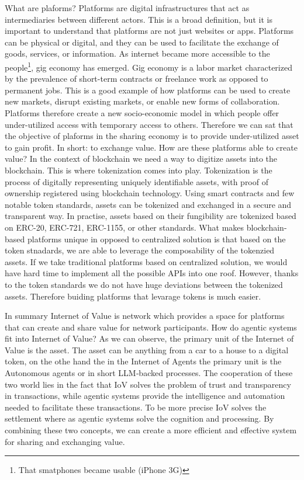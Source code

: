What are plaforms?  Platforms are digital infrastructures that act as intermediaries between different actors. This is a broad definition, but it is important to understand that platforms are not just websites or apps. Platforms can be physical or digital, and they can be used to facilitate the exchange of goods, services, or information. As internet became more accessible to the people\footnote{That smatphones became usable (iPhone 3G)}, gig economy has emerged. Gig economy is a labor market characterized by the prevalence of short-term contracts or freelance work as opposed to permanent jobs. This is a good example of how platforms can be used to create new markets, disrupt existing markets, or enable new forms of collaboration. Platforms therefore create a new socio-economic model in which people offer under-utilized access with temporary access to others. Therefore we can sat that the objective of plaforms in the sharing economy is to provide under-utilized asset to gain profit.
In short: to exchange value. How are these platforms able to create value? In the context of blockchain we need a way to digitize assets into the blockchain. This is where tokenization comes into play. Tokenization is the process of digitally representing uniquely identifiable assets, with proof of ownership registered using blockchain technology. Using smart contracts and few notable token standards, assets can be tokenized and exchanged in a secure and transparent way. In practise, assets based on their fungibility are tokenized based on ERC-20, ERC-721, ERC-1155, or other standards. What makes blockchain-based platforms unique in opposed to centralized solution is that based on the token stnadards, we are able to leverage the composability of the tokenzied assets. If we take traditional platforms based on centralized solution, we would have hard time to implement all the possible APIs into one roof. However, thanks to the token standards we do not have huge deviations between the tokenized assets. Therefore buiding platforms that levarage tokens is much easier.

In summary Internet of Value is network which provides a space for platforms that can create and share value for network participants.
How do agentic systems fit into Internet of Value? As we can observe, the primary unit of the Internet of Value is the asset.
The asset can be anything from a car to a house to a digital token, on the othe hand the in the Internet of Agents the primary unit is the Autonomous agents or in short LLM‑backed processes.
The cooperation of these two world lies in the fact that IoV solves the problem of trust and transparency in transactions, while agentic systems provide the intelligence and automation needed to facilitate these transactions.
To be more precise IoV solves the settlement where as agentic systems solve the cognition and processing.
By combining these two concepts, we can create a more efficient and effective system for sharing and exchanging value.

